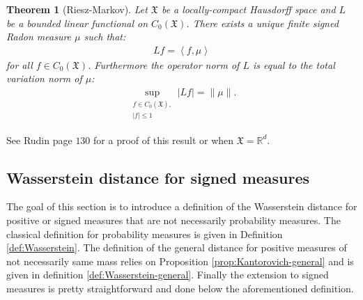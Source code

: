 \documentclass[11pt,a4paper]{article}
\newcommand{\RR}{\mathbb{R}}
\newcommand{\XF}{\mathfrak{X}}
\newcommand{\brac}[1]{\left\langle#1\right\rangle}
\newtheorem{theorem}{Theorem}[section]
\begin{document}
\begin{theorem}[Riesz-Markov]
    Let $\XF$ be a locally-compact Hausdorff space and $L$ be a bounded linear functional on $C_0(\XF)$. There exists a unique finite signed Radon measure $\mu$ such that:
    \begin{align*}
        Lf = \brac{f,\mu}
    \end{align*}
    for all $f \in C_0(\XF)$. Furthermore the operator norm of $L$ is equal to the total variation norm of $\mu$:
    \begin{align*}
        \sup\limits_{\substack{f\in C_0(\XF) ,\\ |f| \leq 1}} |Lf| = \|\mu\|.
    \end{align*}
\end{theorem}
See Rudin \cite{rudin1987real} page $130$ for a proof of this result or \cite{evans2018measure} when $\XF = \RR^d$.

\subsection{Wasserstein distance for signed measures}\label{section:Wasserstein}
The goal of this section is to introduce a definition of the Wasserstein distance for positive or signed measures that are not necessarily probability measures. The classical definition for probability measures is given in Definition \ref{def:Wasserstein}. The definition of the general distance for positive measures of not necessarily same mass relies on Proposition \ref{prop:Kantorovich-general} and is given in definition \ref{def:Wasserstein-general}. Finally the extension to signed measures is pretty straightforward and done below the aforementioned definition. 
\end{document}
